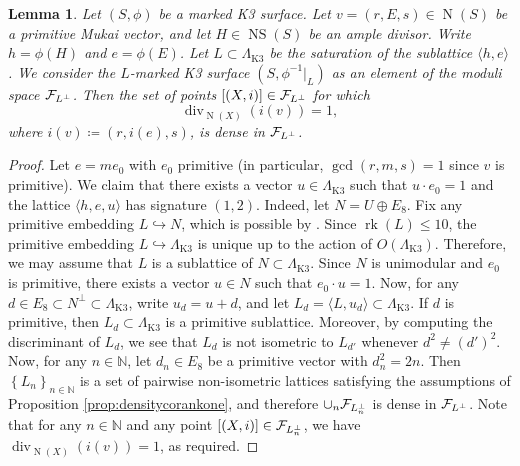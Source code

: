\documentclass[11pt,twoside]{amsart}
\numberwithin{equation}{section}
\newtheorem{lemma}[dummy]{Lemma}
\theoremstyle{definition}
\theoremstyle{plain}
\newcommand{\klat}{\ensuremath{\Lambda_{\operatorname{K3}}}}
\def\NS{\operatorname{NS}}
\def\rk{\operatorname{rk}}
\def\N{\operatorname{N}}
\def\dv{\operatorname{div}}
\begin{document}
\begin{lemma}\label{lem:divisibilityinfamilies}
    Let $(S,\phi)$ be a marked K3 surface.
    Let $v = (r,E,s)\in \operatorname{N}(S)$ be a primitive Mukai vector, and let $H\in \NS(S)$ be an ample divisor. Write $h = \phi(H)$ and $e = \phi(E)$. Let $L\subset \klat$ be the saturation of the sublattice $\langle h,e\rangle$. We consider the $L$-marked K3 surface $(S,\phi^{-1}|_L)$ as an element of the moduli space $\mathcal{F}_{L^\perp}$. Then the set of points $[(X,i)]\in \mathcal{F}_{L^\perp}$ for which 
    \begin{equation}\label{eq:divisibility}
    \dv_{\operatorname{N}(X)}(i(v))=1,
    \end{equation}
    where $i(v)\coloneqq (r,i(e),s)$,
    is dense in $\mathcal{F}_{L^\perp}$.
\end{lemma}
\begin{proof}
    Let $e=me_0$ with $e_0$ primitive (in particular, $\gcd(r,m,s)=1$ since $v$ is primitive). We claim that there exists a vector $u\in \klat$ such that $u\cdot e_0 = 1$ and the lattice $\langle h,e,u\rangle$ has signature $(1,2)$. Indeed, let $N=U\oplus E_8$. Fix any primitive embedding $L\hookrightarrow N$, which is possible by \cite[Corollary 1.12.3]{Nik80}. Since $\rk(L)\leq 10$, the primitive embedding $L\hookrightarrow \klat$ is unique
    up to the action of $O(\klat)$. Therefore, we may assume that $L$ is a sublattice of $N\subset \klat$. Since $N$ is unimodular and $e_0$ is primitive, there exists a vector $u\in N$ such that $e_0\cdot u = 1$. 
    Now, for any $d\in E_8\subset N^\perp\subset \klat$, write $u_d=  u+d$, and let $L_d=\langle L,u_d\rangle\subset \klat$. If $d$ is primitive, then $L_d\subset \klat$ is a primitive sublattice. Moreover, by computing the discriminant of $L_d$, we see that $L_d$ is not isometric to $L_{d'}$ whenever $d^2\neq (d')^2$. Now, for any $n\in \mathbb{N}$, let $d_n\in E_8$ be a primitive vector with $d_n^2 = 2n$. Then $\left\{L_n\right\}_{n\in \mathbb{N}}$ is a set of pairwise non-isometric lattices satisfying the assumptions of Proposition \ref{prop:densitycorankone}, and therefore $\cup_n\mathcal{F}_{L_n^\perp}$ is dense in $\mathcal{F}_{L^\perp}$. Note that for any $n\in \mathbb{N}$ and any point $[(X,i)]\in \mathcal{F}_{L_n^\perp}$, we have $\dv_{\N(X)}(i(v)) = 1$, as required.
\end{proof}
\end{document}
